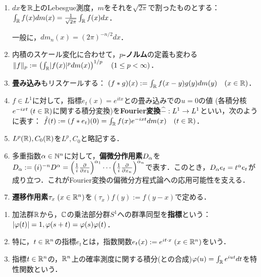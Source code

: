 \documentclass[uplatex,dvipdfmx]{jsreport}
\begin{document}
\begin{notation}\mbox{}
    \begin{enumerate}
        \item $dx$を$\mathbb{R}$上のLebesgue測度，$m$をそれを$\sqrt{2\pi}$で割ったものとする：
        $\int_{\mathbb{R}} f(x)dm(x)=\frac{1}{\sqrt{2\pi}}\int_{\mathbb{R}} f(x)dx$．
        
        一般に，$dm_n(x)=(2\pi)^{-n/2}dx$．
        \item 内積のスケール変化に合わせて，\textbf{$p$-ノルム}の定義も変わる
        $\|f\|_p:=\left(\int_{\mathbb{R}}\lvert f(x)\rvert^pdm(x)\right)^{1/p}\quad(1\le p<\infty)$．
        \item \textbf{畳み込み}もリスケールする：
        $(f*g)(x):=\int_{\mathbb{R}} f(x-y)g(y)dm(y)\quad(x\in\mathbb{R})$．
        \item $f\in L^1$に対して，指標$e_t(x)=e^{itx}$との畳み込みでの$u=0$の値
        (各積分核$e^{-ixt}\;(t\in\mathbb{R})$に関する積分変換)を\textbf{Fourier変換}$\widehat{-}:L^1\to L^1$といい，次のように表す：
        $\hat{f}(t):=(f*e_t)(0)=\int_{\mathbb{R}} f(x)e^{-ixt}dm(x)\quad(t\in\mathbb{R})$．
        \item $L^p(\mathbb{R}),C_0(\mathbb{R})$を$L^p,C_0$と略記する．
        \item 多重指数$\alpha\in\mathbb{N}^n$に対して，\textbf{偏微分作用素}$D_\alpha$を$D_\alpha:=(i)^{-n}D^\alpha=\left(\frac{1}{i}\frac{\partial }{\partial x_1}\right)^{\alpha_1}\cdots\left(\frac{1}{i}\frac{\partial }{\partial x_n}\right)^{\alpha_n}$で表す．このとき，$D_\alpha e_t=t^\alpha e_t$が成り立つ．これがFourier変換の偏微分方程式論への応用可能性を支える．
        \item \textbf{遷移作用素}$\tau_x\;(x\in\mathbb{R}^n)$を$(\tau_x)f(y):=f(y-x)$で定める．
    \end{enumerate}
\end{notation}

\begin{definition}\mbox{}
    \begin{enumerate}
        \item 加法群$\mathbb{R}$から，$\mathbb{C}$の乗法部分群$S^1$への群準同型を\textbf{指標}という：$\lvert\varphi(t)\rvert=1,\varphi(s+t)=\varphi(s)\varphi(t)$．
        \item 特に，$t\in\mathbb{R}^n$の指標$e_t$とは，指数関数$e_t(x):=e^{it\cdot x}\;(x\in\mathbb{R}^n)$をいう．
        \item 指標$t\in\mathbb{R}^n$の，$\mathbb{R}^n$上の確率測度に関する積分(との合成)$\varphi(u)=\int_{\mathbb{R}} e^{iut}dt$を特性関数という．
    \end{enumerate}
\end{definition}
\end{document}
